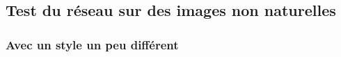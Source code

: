 \documentclass[12pt]{article}
\begin{document}
\subsection{Test du réseau sur des images non naturelles}

\subsubsection*{Avec un style un peu différent}
\begin{figure}[htb]
\centering
  \hfill
  \hfill

\end{figure}
\end{document}
